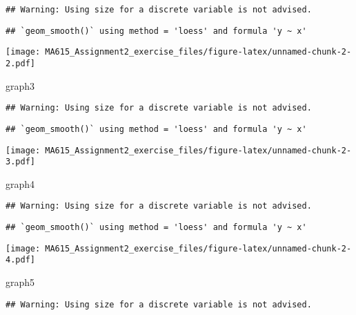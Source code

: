 \documentclass[]{article}
\newenvironment{Shaded}{\begin{snugshade}}{\end{snugshade}}
\newcommand{\NormalTok}[1]{#1}
\begin{document}
\begin{verbatim}
## Warning: Using size for a discrete variable is not advised.
\end{verbatim}

\begin{verbatim}
## `geom_smooth()` using method = 'loess' and formula 'y ~ x'
\end{verbatim}

\texttt{[image: MA615\_Assignment2\_exercise\_files/figure-latex/unnamed-chunk-2-2.pdf]}

\begin{Shaded}
\begin{Highlighting}[]
\NormalTok{graph3}
\end{Highlighting}
\end{Shaded}

\begin{verbatim}
## Warning: Using size for a discrete variable is not advised.
\end{verbatim}

\begin{verbatim}
## `geom_smooth()` using method = 'loess' and formula 'y ~ x'
\end{verbatim}

\texttt{[image: MA615\_Assignment2\_exercise\_files/figure-latex/unnamed-chunk-2-3.pdf]}

\begin{Shaded}
\begin{Highlighting}[]
\NormalTok{graph4}
\end{Highlighting}
\end{Shaded}

\begin{verbatim}
## Warning: Using size for a discrete variable is not advised.
\end{verbatim}

\begin{verbatim}
## `geom_smooth()` using method = 'loess' and formula 'y ~ x'
\end{verbatim}

\texttt{[image: MA615\_Assignment2\_exercise\_files/figure-latex/unnamed-chunk-2-4.pdf]}

\begin{Shaded}
\begin{Highlighting}[]
\NormalTok{graph5}
\end{Highlighting}
\end{Shaded}

\begin{verbatim}
## Warning: Using size for a discrete variable is not advised.
\end{verbatim}
\end{document}
